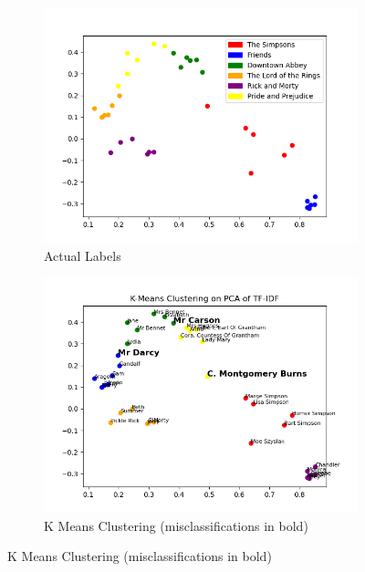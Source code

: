 \documentclass{article}
\begin{document}
\begin{titlepage}
\begin{figure}[H]
    \centering
    \caption{PCA Assessment of TF-IDF}
    \begin{subfigure}[b]{0.45\textwidth}
        \centering
        \includegraphics[width=\textwidth]{images/k_means_across_media_misclassifications.png}
        \caption{Actual Labels}
        \label{fig:subfig1}
    \end{subfigure}
    \hfill
    \begin{subfigure}[b]{0.45\textwidth}
        \centering
        \includegraphics[width=\textwidth]{images/k_means_across_media_predicted.png}
        \caption{K Means Clustering (misclassifications in bold)}
        \label{fig:subfig2}
    \end{subfigure}
    \label{fig:main}
\end{figure} 


\end{titlepage}
\end{document}
